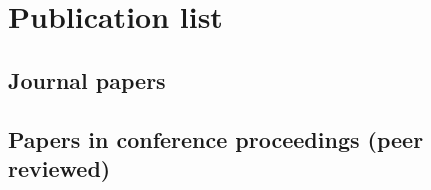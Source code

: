 {}

\chapter*{Publication list}

\footnotesize
\section*{Journal papers}


\section*{Papers in conference proceedings (peer reviewed)}

